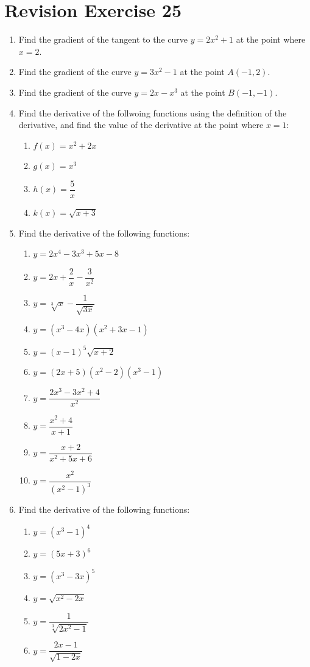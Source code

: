 \documentclass[12pt]{report}
\begin{document}
\section*{Revision Exercise 25}

\begin{enumerate}
  \item Find the gradient of the tangent to the curve $y = 2x^2 + 1$ at the point where
        $x = 2$.
  \item Find the gradient of the curve $y = 3x^2 - 1$ at the point $A(-1, 2)$.
  \item Find the gradient of the curve $y = 2x - x^3$ at the point $B(-1, -1)$.
  \item Find the derivative of the follwoing functions using the definition of the
        derivative, and find the value of the derivative at the point where $x = 1$:
        \begin{enumerate}
          \item $f(x) = x^2 + 2x$
          \item $g(x) = x^3$
          \item $h(x) = \dfrac{5}{x}$
          \item $k(x) = \sqrt{x + 3}$
        \end{enumerate}
  \item Find the derivative of the following functions:
        \begin{enumerate}
          \item $y=2x^{4}-3x^{3}+5x-8$
          \item $y=2x+{\dfrac{2}{x}}-{\dfrac{3}{x^{2}}}$
          \item $y=\sqrt[3]{x}-{\dfrac{1}{\sqrt{3x}}}$
          \item $y=\left(x^{3}-4x\right)\left(x^{2}+3x-1\right)$
          \item $y=(x-1)^{5}{\sqrt{x+2}}$
          \item $y=\left(2x+5\right)\left(x^{2}-2\right)\left(x^{3}-1\right)$
          \item $y={\dfrac{2x^{3}-3x^{2}+4}{x^{2}}}$
          \item $y={\dfrac{x^{2}+4}{x+1}}$
          \item $y={\dfrac{x+2}{x^{2}+5x+6}}$
          \item $y={\dfrac{x^{2}}{\left(x^{2}-1\right)^{3}}}$
        \end{enumerate}
  \item Find the derivative of the following functions:
        \begin{enumerate}
          \item $y=\left(x^{3}-1\right)^{4}$
          \item $y=(5x+3)^{6}$
          \item $y=\left(x^{3}-3x\right)^{5}$
          \item $y={\sqrt{x^{2}-2x}}$
          \item $y={\dfrac{1}{\sqrt[3]{2x^{2}-1}}}$
          \item $y={\dfrac{2x-1}{\sqrt{1-2x}}}$
        \end{enumerate}


\end{enumerate}
\end{document}
